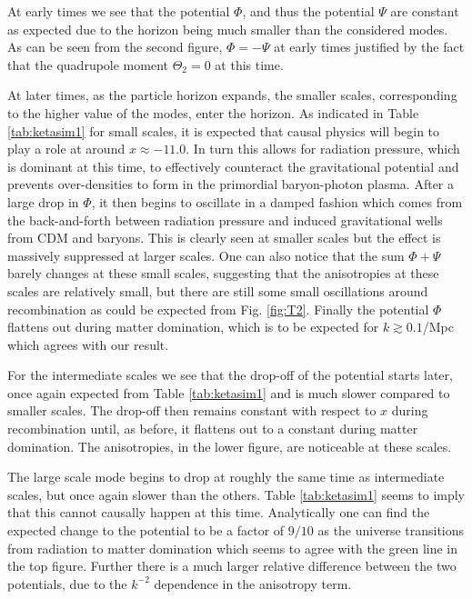 \documentclass[%
reprint,
 amsmath,amssymb,
 aps,
]{revtex4-2}
\begin{document}
At early times we see that the potential $\Phi$, and thus the potential $\Psi$ are constant as expected due to the horizon being much smaller than the considered modes. As can be seen from the second figure, $\Phi=-\Psi$ at early times justified by the fact that the quadrupole moment $\Theta_2=0$ at this time.

At later times, as the particle horizon expands, the smaller scales, corresponding to the higher value of the modes, enter the horizon. As indicated in Table \ref{tab:ketasim1} for small scales, it is expected that causal physics will begin to play a role at around $x\approx -11.0$. In turn this allows for radiation pressure, which is dominant at this time, to effectively counteract the gravitational potential and prevents over-densities to form in the primordial baryon-photon plasma. After a large drop in $\Phi$, it then begins to oscillate in a damped fashion which comes from the back-and-forth between radiation pressure and induced gravitational wells from CDM and baryons. This is clearly seen at smaller scales but the effect is massively suppressed at larger scales. One can also notice that the sum $\Phi+\Psi$ barely changes at these small scales, suggesting that the anisotropies at these scales are relatively small, but there are still some small oscillations around recombination as could be expected from Fig. \ref{fig:T2}. Finally the potential $\Phi$ flattens out during matter domination, which is to be expected for $k\gtrsim0.1$/Mpc which agrees with our result. 

For the intermediate scales we see that the drop-off of the potential starts later, once again expected from Table \ref{tab:ketasim1} and is much slower compared to smaller scales. The drop-off then remains constant with respect to $x$ during recombination until, as before, it flattens out to a constant during matter domination. The anisotropies, in the lower figure, are noticeable at these scales. 

The large scale mode begins to drop at roughly the same time as intermediate scales, but once again slower than the others. Table \ref{tab:ketasim1} seems to imply that this cannot causally happen at this time. Analytically one can find the expected change to the potential to be a factor of $9/10$ as the universe transitions from radiation to matter domination \cite{AST5220LectureNotes} which seems to agree with the green line in the top figure. Further there is a much larger relative difference between the two potentials, due to the $k^{-2}$ dependence in the anisotropy term.
\end{document}
